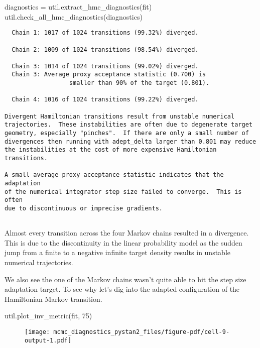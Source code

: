 \documentclass[
  letterpaper,
  DIV=11,
  numbers=noendperiod]{scrartcl}
\newenvironment{Shaded}{\begin{snugshade}}{\end{snugshade}}
\newcommand{\DecValTok}[1]{\textcolor[rgb]{0.68,0.00,0.00}{#1}}
\newcommand{\NormalTok}[1]{\textcolor[rgb]{0.00,0.23,0.31}{#1}}
\newcommand{\OperatorTok}[1]{\textcolor[rgb]{0.37,0.37,0.37}{#1}}
\begin{document}
\begin{Shaded}
\begin{Highlighting}[]
\NormalTok{diagnostics }\OperatorTok{=}\NormalTok{ util.extract\_hmc\_diagnostics(fit)}
\NormalTok{util.check\_all\_hmc\_diagnostics(diagnostics)}
\end{Highlighting}
\end{Shaded}

\begin{verbatim}
  Chain 1: 1017 of 1024 transitions (99.32%) diverged.
 
  Chain 2: 1009 of 1024 transitions (98.54%) diverged.
 
  Chain 3: 1014 of 1024 transitions (99.02%) diverged.
  Chain 3: Average proxy acceptance statistic (0.700) is
                  smaller than 90% of the target (0.801).
 
  Chain 4: 1016 of 1024 transitions (99.22%) diverged.
 
Divergent Hamiltonian transitions result from unstable numerical
trajectories.  These instabilities are often due to degenerate target
geometry, especially "pinches".  If there are only a small number of
divergences then running with adept_delta larger than 0.801 may reduce
the instabilities at the cost of more expensive Hamiltonian transitions.
 
A small average proxy acceptance statistic indicates that the adaptation
of the numerical integrator step size failed to converge.  This is often
due to discontinuous or imprecise gradients.
 
\end{verbatim}

Almost every transition across the four Markov chains resulted in a
divergence. This is due to the discontinuity in the linear probability
model as the sudden jump from a finite to a negative infinite target
density results in unstable numerical trajectories.

We also see the one of the Markov chains wasn't quite able to hit the
step size adaptation target. To see why let's dig into the adapted
configuration of the Hamiltonian Markov transition.

\begin{Shaded}
\begin{Highlighting}[]
\NormalTok{util.plot\_inv\_metric(fit, }\DecValTok{75}\NormalTok{)}
\end{Highlighting}
\end{Shaded}

\begin{figure}[H]

{\centering \texttt{[image: mcmc\_diagnostics\_pystan2\_files/figure-pdf/cell-9-output-1.pdf]}

}

\end{figure}
\end{document}
